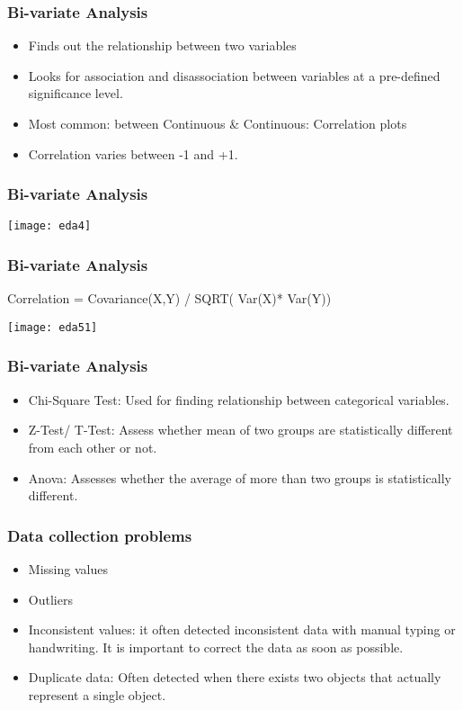 \begin{frame}[fragile]\frametitle{Bi-variate  Analysis}	
\begin{itemize}
\item Finds  out  the  relationship  between  two  variables
\item Looks for association and disassociation between variables at a pre-defined significance level.
\item Most common: between Continuous  \&  Continuous: Correlation plots
\item Correlation varies between -1 and +1.
\end{itemize}
\end{frame}

\begin{frame}[fragile]\frametitle{Bi-variate  Analysis}	
\begin{center}
\texttt{[image: eda4]}
\end{center}
\end{frame}

\begin{frame}[fragile]\frametitle{Bi-variate  Analysis}	
Correlation = Covariance(X,Y) / SQRT( Var(X)* Var(Y)) 	
\begin{center}
\texttt{[image: eda51]}
\end{center}
\end{frame}

\begin{frame}[fragile]\frametitle{Bi-variate  Analysis}
	
\begin{itemize}
\item  Chi-Square Test: Used for finding relationship between categorical variables. 
\item  Z-Test/ T-Test: Assess whether mean of two groups are statistically different from each other or not.
\item Anova: Assesses  whether  the  average  of  more  than  two  groups  is  statistically 
different.
\end{itemize}
\end{frame}

\begin{frame}[fragile]\frametitle{Data collection problems}
		\begin{itemize}
			\item Missing values
			\item Outliers
			\item Inconsistent values: it often detected inconsistent data with manual
			typing or handwriting. It is important to correct the data as soon as possible.
			\item Duplicate data: Often detected when there exists two objects that 
			actually represent a single object. 
\end{itemize}
\end{frame}


